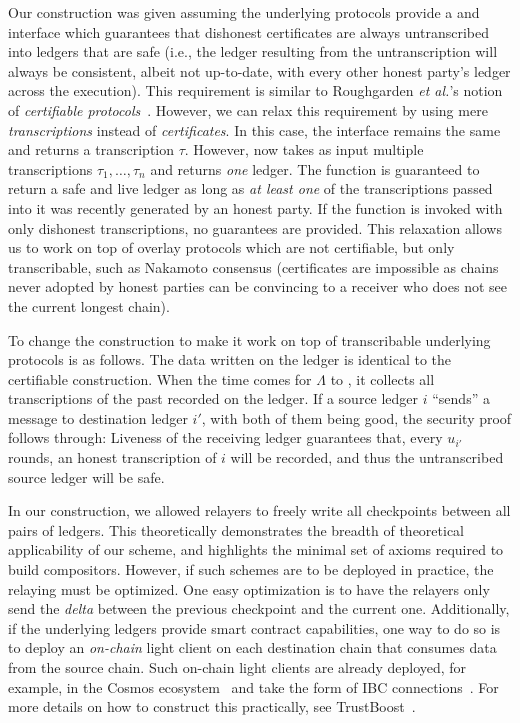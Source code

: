 Our \rollerblade construction was given assuming the underlying protocols
provide a \transcribe and \untranscribe interface which guarantees that
dishonest certificates are always untranscribed into ledgers that are
safe (i.e., the ledger resulting from the untranscription will always
be consistent, albeit not up-to-date, with every other honest party's
ledger across the execution). This requirement is similar to Roughgarden
\emph{et al.}'s notion of \emph{certifiable protocols}~\cite{certifiable-roughgarden}.
However, we can relax this requirement by using mere \emph{transcriptions}
instead of \emph{certificates}. In this case, the \transcribe interface
remains the same and returns a transcription $\tau$. However, \untranscribe
now takes as input multiple transcriptions $\tau_1, \ldots, \tau_n$ and
returns \emph{one} ledger. The \untranscribe function is guaranteed to return
a safe and live ledger as long as \emph{at least one} of the transcriptions
passed into it was recently generated by an honest party. If the \untranscribe
function is invoked with only dishonest transcriptions, no guarantees are
provided. This relaxation allows us to work on top of overlay protocols
which are not certifiable, but only transcribable, such as Nakamoto consensus
(certificates are impossible as chains never adopted by honest parties
can be convincing to a receiver who does not see the current longest chain).

To change the \rollerblade construction to make it work on top of transcribable
underlying protocols is as follows. The data written on the ledger is identical to the
certifiable \rollerblade construction. When the time comes for $\Lambda$ to
\untranscribe, it collects all transcriptions of the past recorded on the ledger.
If a source ledger $i$ ``sends'' a message to destination ledger $i'$, with both
of them being good, the security proof follows through:
Liveness of the receiving ledger guarantees that, every $u_{i'}$ rounds, an honest
transcription of $i$ will be recorded, and thus the untranscribed source ledger
will be safe.

In our \rollerblade construction, we allowed relayers to freely write all
checkpoints between all pairs of ledgers. This theoretically demonstrates
the breadth of theoretical applicability of our scheme, and highlights
the minimal set of axioms required to build compositors.
However, if such schemes are to be deployed in practice, the relaying
must be optimized. One easy optimization is to have the relayers only
send the \emph{delta} between the previous checkpoint and the current one.
Additionally, if the underlying ledgers provide smart contract
capabilities, one way to do so is to deploy an \emph{on-chain} light
client on each destination chain that consumes data from the source
chain. Such on-chain light clients are already deployed, for example,
in the Cosmos ecosystem~\cite{cosmos} and take the form of IBC
connections~\cite{ibc}. For more details on how to construct this
practically, see TrustBoost~\cite{trustboost}.
